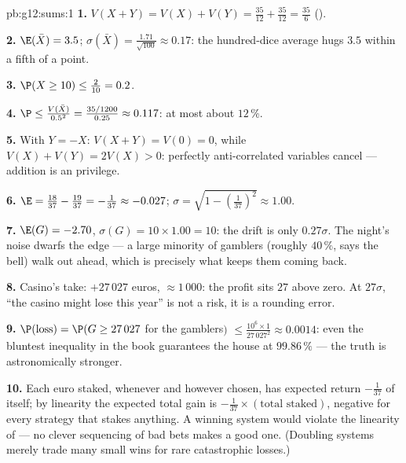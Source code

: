\begin{solution}{pb:g12:sums:1}
\textbf{1.} $V(X + Y) = V(X) + V(Y) = \frac{35}{12} +
\frac{35}{12} = \frac{35}{6}$ ().

\textbf{2.} $\E(\bar X) = 3.5$;
$\sigma(\bar X) = \frac{1.71}{\sqrt{100}} \approx 0.17$: the
hundred-dice average hugs $3.5$ within a fifth of a point.

\textbf{3.} $\P(X \geq 10) \leq \frac{2}{10} = 0.2$.

\textbf{4.} $\P \leq \frac{V(\bar X)}{0.5^2} =
\frac{35/1200}{0.25} \approx 0.117$: at most about
$12\,\%$.

\textbf{5.} With $Y = -X$: $V(X + Y) = V(0) = 0$, while
$V(X) + V(Y) = 2V(X) > 0$: perfectly anti-correlated variables
cancel ---  addition is an  privilege.

\textbf{6.} $\E = \frac{18}{37} - \frac{19}{37} =
-\frac{1}{37} \approx -0.027$;
$\sigma = \sqrt{1 - \left(\frac{1}{37}\right)^2} \approx
1.00$.

\textbf{7.} $\E(G) = -2.70$, $\sigma(G) = 10 \times 1.00 =
10$: the drift is only $0.27\sigma$. The night's noise dwarfs
the edge --- a large minority of gamblers (roughly $40\,\%$,
says the bell) walk out ahead, which is precisely what keeps
them coming back.

\textbf{8.} Casino's take:  $+27\,027$ euros,
 $\approx 1\,000$: the profit sits $27$
 above zero. At $27\sigma$, ``the casino
might lose this year'' is not a risk, it is a rounding error.

\textbf{9.} $\P(\text{loss}) = \P(G \geq 27\,027$ for the
gamblers$)$ $\leq \frac{10^6 \times 1}{27\,027^2} \approx
0.0014$: even the bluntest inequality in the book guarantees
the house at $99.86\,\%$ --- the truth is astronomically
stronger.

\textbf{10.} Each euro staked, whenever and however chosen,
has expected return $-\frac{1}{37}$ of itself; by linearity
the expected total gain is $-\frac{1}{37} \times
(\text{total staked})$, negative for every strategy that
stakes anything. A winning system would violate the linearity
of  --- no clever sequencing of bad bets makes a
good one. (Doubling systems merely trade many small wins for
rare catastrophic losses.)


\end{solution}
